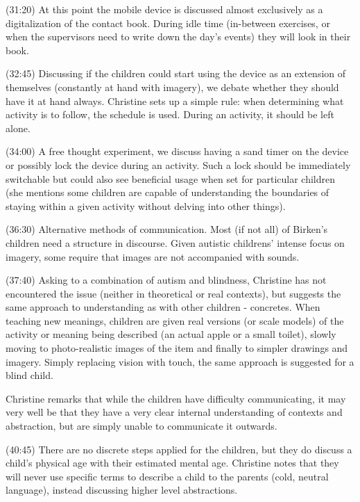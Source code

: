 (31:20) At this point the mobile device is discussed almost exclusively as a digitalization of the contact book. During idle time (in-between exercises, or when the supervisors need to write down the day's events) they will look in their book. 

(32:45) Discussing if the children could start using the device as an extension of themselves (constantly at hand with imagery), we debate whether they should have it at hand always. Christine sets up a simple rule: when determining what activity is to follow, the schedule is used. During an activity, it should be left alone. 

(34:00) A free thought experiment, we discuss having a sand timer on the device or possibly lock the device during an activity. Such a lock should be immediately switchable but could also see beneficial usage when set for particular children (she mentions some children are capable of understanding the boundaries of staying within a given activity without delving into other things).

(36:30) Alternative methods of communication. Most (if not all) of Birken's children need a structure in discourse. Given autistic childrens' intense focus on imagery, some require that images are not accompanied with sounds.

(37:40) Asking to a combination of autism and blindness, Christine has not encountered the issue (neither in theoretical or real contexts), but suggests the same approach to understanding as with other children - concretes. When teaching new meanings, children are given real versions (or scale models) of the activity or meaning being described (an actual apple or a small toilet), slowly moving to photo-realistic images of the item and finally to simpler drawings and imagery. Simply replacing vision with touch, the same approach is suggested for a blind child.

Christine remarks that while the children have difficulty communicating, it may very well be that they have a very clear internal understanding of contexts and abstraction, but are simply unable to communicate it outwards. 

(40:45) There are no discrete steps applied for the children, but they do discuss a child's physical age with their estimated mental age. Christine notes that they will never use specific terms to describe a child to the parents (cold, neutral language), instead discussing higher level abstractions. 

